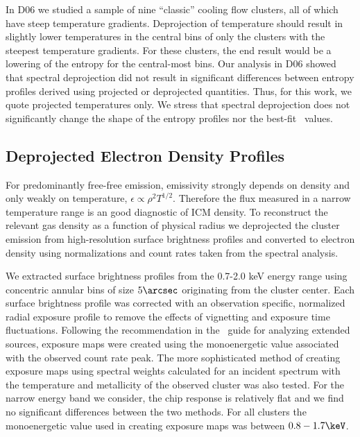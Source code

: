\documentclass[apj]{emulateapj}
\begin{document}
In D06 we studied a sample of nine ``classic'' cooling flow clusters,
all of which have steep temperature gradients. Deprojection of
temperature should result in slightly lower temperatures in the
central bins of only the clusters with the steepest temperature
gradients. For these clusters, the end result would be a lowering of
the entropy for the central-most bins. Our analysis in D06 showed that
spectral deprojection did not result in significant differences
between entropy profiles derived using projected or deprojected
quantities. Thus, for this work, we quote projected temperatures
only. We stress that spectral deprojection does not significantly
change the shape of the entropy profiles nor the best-fit
\kna\ values.

\subsection{Deprojected Electron Density Profiles}
\label{sec:dene}

For predominantly free-free emission, emissivity strongly depends on
density and only weakly on temperature, $\epsilon \propto \rho^2
T^{1/2}$. Therefore the flux measured in a narrow temperature range is
an good diagnostic of ICM density. To reconstruct the relevant gas
density as a function of physical radius we deprojected the cluster
emission from high-resolution surface brightness profiles and
converted to electron density using normalizations and count rates
taken from the spectral analysis.

We extracted surface brightness profiles from the 0.7-2.0 keV energy
range using concentric annular bins of size $5\arcsec$ originating
from the cluster center. Each surface brightness profile was corrected
with an observation specific, normalized radial exposure profile to
remove the effects of vignetting and exposure time
fluctuations. Following the recommendation in the \ciao\ guide for
analyzing extended sources, exposure maps were created using the
monoenergetic value associated with the observed count rate peak. The
more sophisticated method of creating exposure maps using spectral
weights calculated for an incident spectrum with the temperature and
metallicity of the observed cluster was also tested. For the narrow
energy band we consider, the chip response is relatively flat and we
find no significant differences between the two methods. For all
clusters the monoenergetic value used in creating exposure maps was
between $0.8-1.7\keV$.
\end{document}
